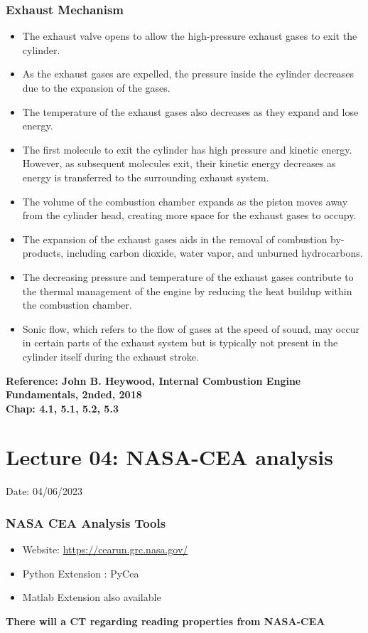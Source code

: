 \documentclass{article}
\begin{document}
  \subsubsection*{Exhaust Mechanism}
  \begin{itemize}
	\item The exhaust valve opens to allow the high-pressure exhaust gases to exit the cylinder.

	\item As the exhaust gases are expelled, the pressure inside the cylinder decreases due to the expansion of the gases.
	
	\item The temperature of the exhaust gases also decreases as they expand and lose energy.
	
	\item The first molecule to exit the cylinder has high pressure and kinetic energy. However, as subsequent molecules exit, their kinetic energy decreases as energy is transferred to the surrounding exhaust system.
	
	\item The volume of the combustion chamber expands as the piston moves away from the cylinder head, creating more space for the exhaust gases to occupy.
	
	\item The expansion of the exhaust gases aids in the removal of combustion by-products, including carbon dioxide, water vapor, and unburned hydrocarbons.
	
	\item The decreasing pressure and temperature of the exhaust gases contribute to the thermal management of the engine by reducing the heat buildup within the combustion chamber.
	
	\item Sonic flow, which refers to the flow of gases at the speed of sound, may occur in certain parts of the exhaust system but is typically not present in the cylinder itself during the exhaust stroke.
  \end{itemize}
  \vspace*{1cm}
  \textbf{Reference: John B. Heywood, Internal Combustion Engine Fundamentals, 2nded, 2018\\ Chap: 4.1, 5.1, 5.2, 5.3}

  \pagebreak
  \section{Lecture 04: NASA-CEA analysis} 
	\hfill Date: 04/06/2023

	\subsubsection*{NASA CEA Analysis Tools}
	\begin{itemize}
		\item Website: \href{https://cearun.grc.nasa.gov/}{https://cearun.grc.nasa.gov/} 
		\item Python Extension : PyCea 
		\item Matlab Extension also available 
	\end{itemize}
	\textbf{There will a CT regarding reading properties from NASA-CEA }
\end{document}

